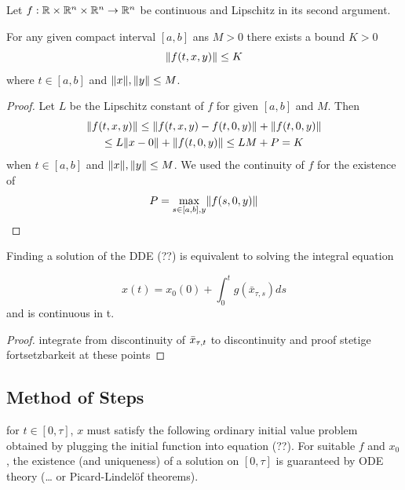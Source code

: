 \documentclass[10pt]{article}
\begin{document}
\begin{lemma}
    \label{lemma-bounded-f}

    Let $f:\mathbb{R}\times\mathbb{R}^n\times\mathbb{R}^n\rightarrow\mathbb{R}^n$ be continuous and Lipschitz in its second argument.

    For any given compact interval $[a,b]$ ans $M>0$ there exists a bound $K>0$
    \begin{equation}
        \lVert f(t,x,y)\rVert\leq K
    \end{equation}
    where $t\in[a,b]$ and $\lVert x\rVert,\lVert y\rVert\leq M$.
\end{lemma}

\begin{proof}
    Let $L$ be the Lipschitz constant of $f$ for given $[a,b]$ and $M$. Then
    \begin{multline}
        \lVert f(t,x,y)\rVert \leq \lVert f(t,x,y) - f(t,0,y)\rVert + \lVert f(t,0,y)\rVert\\
        \leq L\lVert x-0\rVert + \lVert f(t,0,y)\rVert \leq LM+P = K
    \end{multline}
    when $t\in[a,b]$ and $\lVert x\rVert,\lVert y\rVert\leq M$. We used the continuity of $f$ for the existence of
    \begin{equation}
        P = \max_{s\in [a,b],y}\lVert f(s,0,y)\rVert
    \end{equation}
\end{proof}

\begin{lemma}
    \label{lemma-integral-equation}


    Finding a solution of the DDE (??) is equivalent to solving the integral equation

    \begin{equation}
        x(t) = x_0(0) + \int_0^t g(\bar{x}_{\tau,s})ds
    \end{equation}
    and is continuous in t.
\end{lemma}

\begin{proof}
integrate from discontinuity of $\bar{x}_{\tau,t}$ to discontinuity and proof stetige fortsetzbarkeit at these points
\end{proof}

\subsection{Method of Steps} \label{sec:method-of-steps}
for $t\in [0,\tau]$, $x$ must satisfy the following ordinary initial value problem obtained by plugging the initial function into equation (??). For suitable $f$ and $x_0$, the existence (and uniqueness) of a solution on $[0,\tau]$ is guaranteed by ODE theory (\ldots{} or Picard-Lindelöf theorems).
\end{document}
